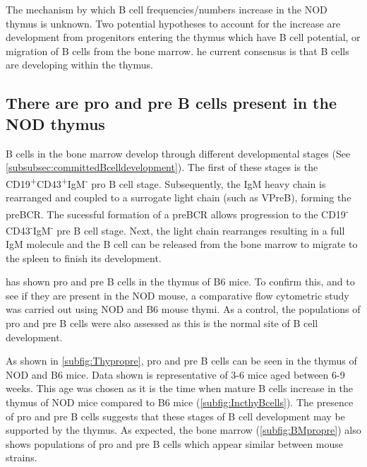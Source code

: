 The mechanism by which B cell frequencies/numbers increase in the NOD thymus is unknown. 
Two potential hypotheses to account for the increase are development from progenitors entering the thymus which have B cell potential, or migration of B cells from the bone marrow. \toref{}
he current consensus is that B cells are developing within the thymus. 


\subsection{There are pro and pre B cells present in the NOD thymus}
\label{subsec:proandpre}


B cells in the bone marrow develop through different developmental stages (See \cref{subsubsec:committedBcelldevelopment}).
The first of these stages is the CD19\textsuperscript{+}CD43\textsuperscript{+}IgM\textsuperscript{-} pro B cell stage.
Subsequently, the IgM heavy chain is rearranged and coupled to a surrogate light chain (such as VPreB), forming the preBCR. 
The sucessful formation of a preBCR allows progression to the CD19\textsuperscript{-}CD43\textsuperscript{-}IgM\textsuperscript{-} pre B cell stage.
Next, the light chain rearranges resulting in a full IgM molecule and the B cell can be released from the bone marrow to migrate to the spleen to finish its development.


\citet{Akashi2000} has shown pro and pre B cells in the thymus of B6 mice. 
To confirm this, and to see if they are present in the NOD mouse, a comparative flow cytometric study was carried out using NOD and B6 mouse thymi.
As a control, the populations of pro and pre B cells were also assessed as this is the normal site of B cell development.



As shown in \cref{subfig:Thypropre}, pro and pre B cells can be seen in the thymus of NOD and B6 mice.
Data shown is representative of 3-6 mice aged between 6-9 weeks. %
This age was chosen as it is the time when mature B cells increase in the thymus of NOD mice compared to B6 mice (\cref{subfig:IncthyBcells}).
The presence of pro and pre B cells suggests that these stages of B cell development may be supported by the thymus. 
As expected, the bone marrow (\cref{subfig:BMpropre}) also shows populations of pro and pre B cells which appear similar between mouse strains.


